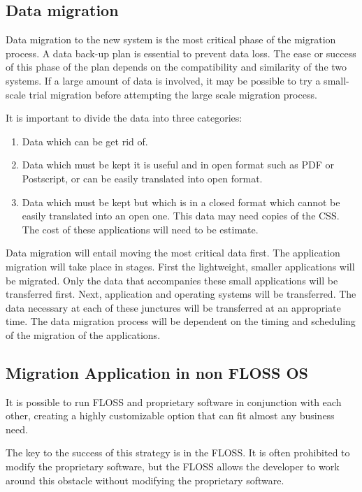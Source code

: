     \subsection{Data migration}
    
    Data migration to the new system is the most critical phase of the migration process. A data back-up plan is essential to prevent data loss. The ease or success of this phase of the plan depends on the compatibility and similarity of the two systems. If a large amount of data is involved, it may be possible to try a small-scale trial migration before attempting the large scale migration process. 
  
    It is important to divide the data into three categories:
    \begin{enumerate}[itemsep=0ex]
    \item Data which can be get rid of.
     \item Data which must be kept it is useful and in open format such as PDF or Postscript, or can be easily translated into open format.
      \item  Data which must be kept but which is in a closed format which cannot be easily translated into an open one. This data may need copies of the CSS. The cost of these applications will need to be estimate.
    \end{enumerate}

    Data migration will entail moving the most critical data first. The application migration will take place in stages. First the lightweight, smaller applications will be migrated. Only the data that accompanies these small applications will be transferred first. Next, application and operating systems will be transferred. The data necessary at each of these junctures will be transferred at an appropriate time. The data migration process will be dependent on the timing and scheduling of the migration of the applications. 
    
    
    \subsection {Migration Application in non FLOSS OS}
    
    It is possible to run FLOSS and proprietary software in conjunction with each other, creating a highly customizable option that can fit almost any business need.
    
    The key to the success of this strategy is in the FLOSS. It is often prohibited to modify the proprietary software, but the FLOSS allows the developer to work around this obstacle without modifying the proprietary software. 
    
